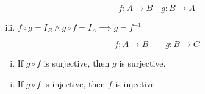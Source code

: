 \begin{frame}{}
  \begin{theorem}[]
    \[
      f: A \to B \quad g: B \to A
    \]

    \begin{enumerate}[(i)]
      \setcounter{enumi}{2}
      \item $f \circ g = I_B \land g \circ f = I_A \implies g = f^{-1}$
    \end{enumerate}
  \end{theorem}

  \pause
  \begin{center}
  \end{center}

  \pause
  \begin{theorem}[]
    \[
      f: A \to B \qquad g: B \to C
    \]

    \begin{enumerate}[(i)]
      \item If $g \circ f$ is surjective, then $g$ is surjective.
      \item If $g \circ f$ is injective, then $f$ is injective.
    \end{enumerate}
  \end{theorem}

  \pause
  \begin{center}
  \end{center}
\end{frame}
